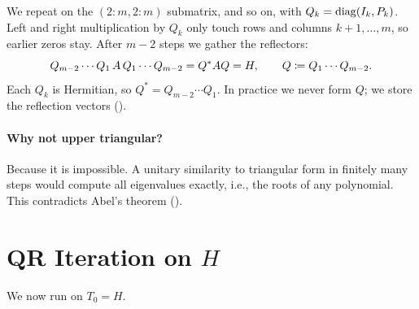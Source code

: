 We repeat on the $(2{:}m, 2{:}m)$ submatrix, and so on, with $Q_k = \operatorname{diag}(I_k, P_k)$. Left and right multiplication by $Q_k$ only touch rows and columns $k + 1, \dots, m$, so earlier zeros stay. After $m - 2$ steps we gather the reflectors:
\begin{equation}
  Q_{m-2}\cdots Q_1\,A\,Q_1\cdots Q_{m-2} = Q^\ast AQ = H, \qquad Q \coloneqq Q_1\cdots Q_{m-2}.
\end{equation}
Each $Q_k$ is Hermitian, so $Q^\ast = Q_{m-2}\cdots Q_1$. In practice we never form $Q$; we store the reflection vectors ().

\paragraph{Why not upper triangular?} Because it is impossible. A unitary similarity to triangular form in finitely many steps would compute all eigenvalues exactly, i.e., the roots of any polynomial. This contradicts Abel's theorem ().

\section{QR Iteration on $H$}
\label{sec:qr-hessenberg}

We now run  on $T_0 = H$.

